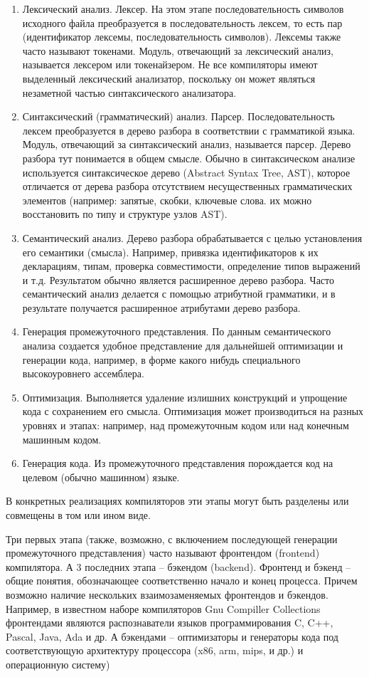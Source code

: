 \documentclass[a4paper,12pt]{article}
\begin{document}
\begin{enumerate}
  \item Лексический анализ. Лексер. На этом этапе последовательность символов
  исходного файла преобразуется в последовательность лексем, то есть пар (идентификатор
  лексемы, последовательность символов). Лексемы также часто называют токенами.
  Модуль, отвечающий за лексический анализ, называется лексером или
  токенайзером. Не все компиляторы имеют выделенный лексический анализатор,
  поскольку он может являться незаметной частью синтаксического анализатора.
  \item Синтаксический (грамматический) анализ. Парсер. Последовательность
  лексем преобразуется в дерево разбора в соответствии с грамматикой языка.
  Модуль, отвечающий за синтаксический анализ, называется парсер. Дерево
  разбора тут понимается в общем смысле. Обычно в синтаксическом анализе
  используется синтаксическое дерево (Abstract Syntax Tree, AST), которое
  отличается от дерева разбора отсутствием несущественных грамматических элементов
  (например: запятые, скобки, ключевые слова. их можно восстановить по
  типу и структуре узлов AST).
  \item Семантический анализ. Дерево разбора обрабатывается с целью
  установления его семантики (смысла). Например, привязка идентификаторов к
  их декларациям, типам, проверка совместимости, определение типов выражений и
  т.д. Результатом обычно является расширенное дерево разбора. Часто
  семантический анализ делается с помощью атрибутной грамматики, и в результате
  получается расширенное атрибутами дерево разбора.
  \item Генерация промежуточного представления. По данным семантического
  анализа создается удобное представление для дальнейшей оптимизации и
  генерации кода, например, в форме какого нибудь специального высокоуровнего
  ассемблера.
  \item Оптимизация. Выполняется удаление излишних конструкций и упрощение кода
  с сохранением его смысла. Оптимизация может производиться на разных уровнях и
  этапах: например, над промежуточным кодом или над конечным машинным кодом.
  \item Генерация кода. Из промежуточного представления порождается код на
  целевом (обычно машинном) языке.
\end{enumerate}
В конкретных реализациях компиляторов эти этапы могут быть разделены или
совмещены в том или ином виде.

Три первых этапа (также, возможно, с включением последующей генерации
промежуточного представления) часто называют фронтендом (frontend) компилятора.
А 3 последних этапа -- бэкендом (backend). Фронтенд и бэкенд -- общие понятия,
обозначающее соответственно начало и конец процесса. Причем возможно наличие
нескольких взаимозаменяемых фронтендов и бэкендов. Например, в известном наборе
компиляторов Gnu Compiller Collections фронтендами являются распознаватели
языков программирования C, C++, Pascal, Java, Ada и др. А бэкендами --
оптимизаторы и генераторы кода под соответствующую архитектуру процессора
(x86, arm, mips, и др.) и операционную систему)
\end{document}
